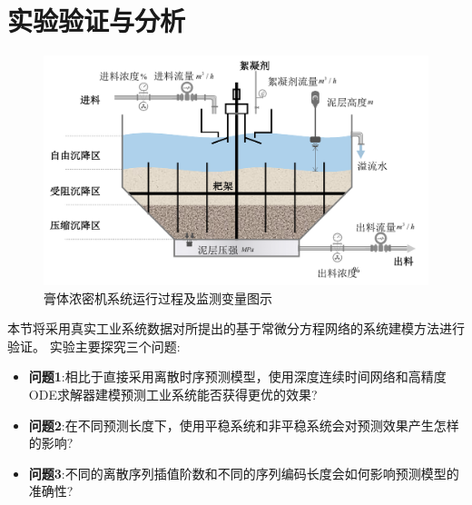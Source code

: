 \section{实验验证与分析}
\label{sec:case}

\begin{figure}[t]
\centering
\includegraphics[width=\linewidth]{figures/chapter3/thickener.pdf}
\caption{
膏体浓密机系统运行过程及监测变量图示
}
\label{fig:nfca_thickener}
\end{figure}

本节将采用真实工业系统数据对所提出的基于常微分方程网络的系统建模方法进行验证。
实验主要探究三个问题:
\begin{itemize}
\item \textbf{问题1}:相比于直接采用离散时序预测模型，使用深度连续时间网络和高精度ODE求解器建模预测工业系统能否获得更优的效果?
\item \textbf{问题2}:在不同预测长度下，使用平稳系统和非平稳系统会对预测效果产生怎样的影响?
\item \textbf{问题3}:不同的离散序列插值阶数和不同的序列编码长度会如何影响预测模型的准确性?
\end{itemize}

